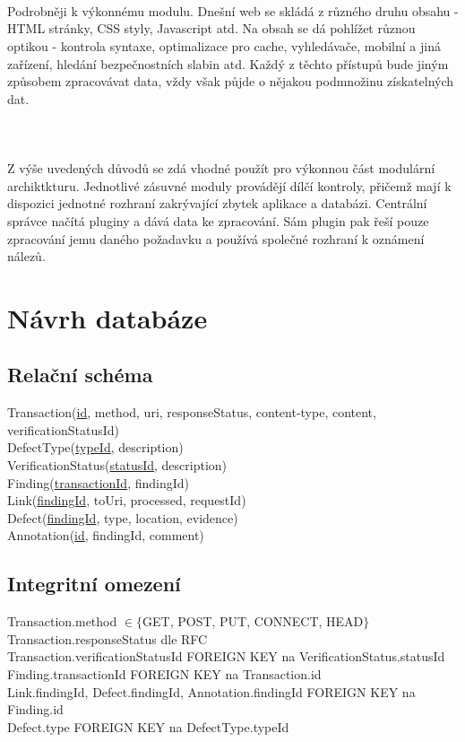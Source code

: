 \documentclass[10pt]{article}
\begin{document}
\paragraph{~}Podrobn\v{e}ji k v\'ykonn\'emu modulu. Dne\v{s}n\'i web se skl\'ad\'a z r\r{u}zn\'eho druhu obsahu - HTML str\'anky, CSS styly, Javascript atd. Na obsah se d\'a pohl\'i\v{z}et r\r{u}znou optikou - kontrola syntaxe, optimalizace pro cache, vyhled\'ava\v{c}e, mobiln\'i a jin\'a za\v{r}\'izen\'i, hled\'an\'i bezpe\v{c}nostn\'ich slabin atd. Ka\v{z}d\'y z t\v{e}chto p\v{r}\'istup\r{u} bude jin\'ym zp\r{u}sobem zpracov\'avat data, v\v{z}dy v\v{s}ak p\r{u}jde o n\v{e}jakou podmno\v{z}inu z\'iskateln\'ych dat. 
\paragraph{~}Z v\'y\v{s}e uveden\'ych d\r{u}vod\r{u} se zd\'a vhodn\'e pou\v{z}\'it pro v\'ykonnou \v{c}\'ast modul\'arn\'i archiktkturu. Jednotliv\'e z\'asuvn\'e moduly prov\'ad\v{e}j\'i d\'il\v{c}\'i kontroly, p\v{r}i\v{c}em\v{z} maj\'i k dispozici jednotn\'e rozhran\'i zakr\'yvaj\'ic\'i zbytek aplikace a datab\'azi. Centr\'aln\'i spr\'avce na\v{c}\'it\'a pluginy a d\'av\'a data ke zpracov\'an\'i. S\'am plugin pak \v{r}e\v{s}\'i pouze zpracov\'an\'i jemu dan\'eho po\v{z}adavku a pou\v{z}\'iv\'a spole\v{c}n\'e rozhran\'i k ozn\'amen\'i n\'alez\r{u}.
\section{N\'avrh datab\'aze}

\subsection{Rela\v{c}n\'i sch\'ema}
Transaction(\underline{id}, method, uri, responseStatus, content-type, content, verificationStatusId)\\
DefectType(\underline{typeId}, description)\\
VerificationStatus(\underline{statusId}, description)\\
Finding(\underline{transactionId}, findingId)\\
Link(\underline{findingId}, toUri, processed, requestId)\\
Defect(\underline{findingId}, type, location, evidence)\\
Annotation(\underline{id}, findingId, comment)\\
\subsection{Integritn\'i omezen\'i}
Transaction.method $\in \{$GET, POST, PUT, CONNECT, HEAD$\}$\\
Transaction.responseStatus dle RFC\\
Transaction.verificationStatusId FOREIGN KEY na VerificationStatus.statusId\\
Finding.transactionId FOREIGN KEY na Transaction.id\\
Link.findingId, Defect.findingId, Annotation.findingId FOREIGN KEY na Finding.id\\
Defect.type FOREIGN KEY na DefectType.typeId\\
\end{document}
